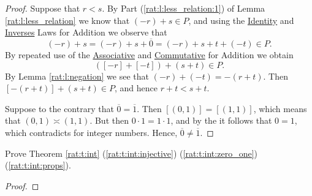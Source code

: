 \begin{proof}

	Suppose that $r < s$. By Part (\ref{rat:l:less_relation:1}) of Lemma \ref{rat:l:less_relation} we know that $(-r) + s \in P$, and using the \hyperref[rat:t:props:identity_add]{Identity} and \hyperref[rat:t:props:inverses_add]{Inverses} Laws for Addition we observe that
	\[
		(-r) + s = (-r) + s + \overline{0} = (-r) + s + t + (-t) \in P.
	\]
	By repeated use of the \hyperref[rat:t:props:associative_add]{Associative} and \hyperref[rat:t:props:commutative_add]{Commutative} for Addition we obtain
	\[
		([-r] + [-t]) + (s + t) \in P.
	\]
	By Lemma \ref{rat:l:negation} we see that $(-r) + (-t) = -(r + t)$. Then $[-(r + t)] + (s + t) \in P$, and hence $r + t < s + t$.

	Suppose to the contrary that $\overline{0} = \overline{1}$. Then $[(0, 1)] = [(1, 1)]$, which means that $(0, 1) \asymp (1, 1)$. But then $0 \cdot 1 = 1 \cdot 1$, and by the  it follows that $0 = 1$, which contradicts  for integer numbers. Hence, $\overline{0} \not= \overline{1}$.
\end{proof}


\Newpage
\begin{exercise} %
	Prove Theorem \ref{rat:t:int} (\ref{rat:t:int:injective}) (\ref{rat:t:int:zero_one}) (\ref{rat:t:int:props}).
\end{exercise}

\begin{proof}
	\hfill

	\TBD


\end{proof}



